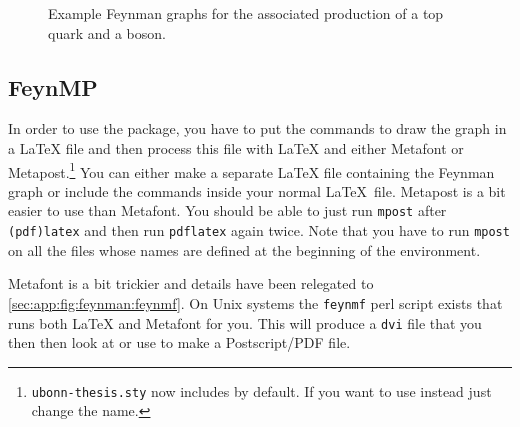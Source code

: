 \begin{figure}[htbp]
  \centering
  \quad
  \caption{Example Feynman graphs for the associated production
    of a top quark and a \PZ boson.}%
  \label{fig:tZq-pyfeyn}
\end{figure}


\subsection{FeynMP}%
\label{sec:fig:feynman:feynmp}

In order to use the  package, you have to put
the commands to draw the graph in a \LaTeX{} file and then process
this file with \LaTeX{} and either Metafont or
Metapost.\footnote{\texttt{ubonn-thesis.sty} now includes 
  by default.
  If you want to use  instead just change the name.} 
You can either make
a separate \LaTeX{} file containing the Feynman graph or include the
commands inside your normal \LaTeX\ file.
Metapost is a bit easier to use than Metafont.
You should be able to just run
\texttt{mpost} after \texttt{(pdf)latex} and then run %
\texttt{pdflatex} again twice.
Note that you have to run
\texttt{mpost} on all the files whose names are defined at the
beginning of the  environment.%

Metafont is a bit trickier and details have been relegated to
\cref{sec:app:fig:feynman:feynmf}. 
On Unix systems the \texttt{feynmf} perl script exists that runs both \LaTeX{} and
Metafont for you. This will produce a \texttt{dvi} file that you then
then look at or use to make a Postscript/PDF file.

